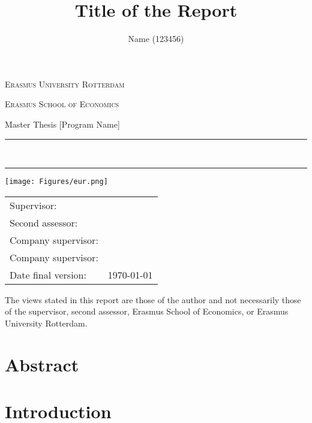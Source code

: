 \documentclass[a4paper,11pt]{article}
\author{Name (123456)}
\title{Title of the Report}
\newcommand{\program}{Master Thesis [Program Name]} %
\newcommand{\supervisor}{}
\newcommand{\secondassesor}{}
\newcommand{\compfirst}{}
\newcommand{\compsecond}{}
\begin{document}
\begin{titlepage}
\makeatletter
\begin{center}
	\textsc{Erasmus University Rotterdam}
	\par \textsc{Erasmus School of Economics}
	\par  \program

	\vfill \hrule height .08em \bigskip
	\par\huge\@title\bigskip
	\par\Large\@author\,\bigskip
	\hrule height .08em\normalsize
	
	\vfill
	\texttt{[image: Figures/eur.png]} %
	\vfill
	
	\begin{tabular}{ll}
		\toprule
		Supervisor: & \supervisor\\
		Second assessor: & \secondassesor\\
        Company supervisor: & \compfirst\\
        Company supervisor: & \compsecond\\
		Date final version: & \today\\
		\bottomrule
	\end{tabular}
	
	\vfill
	The views stated in this report are those of the author and not necessarily those of the supervisor, second assessor, Erasmus School of Economics, or Erasmus University Rotterdam.
\end{center}
\makeatother
\end{titlepage}

\thispagestyle{empty}


\newpage
\section*{Abstract}


\newpage
{}
\clearpage
\begin{spacing}{1.2}
  \tableofcontents
\end{spacing}
\thispagestyle{empty}


\newpage\setcounter{page}{1}

\section{Introduction}\label{sec:introduction}

\end{document}
